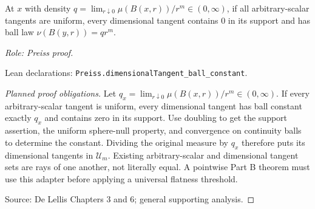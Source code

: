 \begin{lemma}
\label{lem:dimensional-tangent-ball-constant}






At $x$ with density $q=\lim_{r\downarrow0}\mu(B(x,r))/r^m\in(0,\infty)$, if all arbitrary-scalar tangents are uniform, every dimensional tangent contains $0$ in its support and has ball law $\nu(B(y,r))=qr^m$.
\par\emph{Role: Preiss proof.}
\par Lean declarations: \texttt{Preiss.dimensionalTangent\_ball\_constant}.
\end{lemma}
\begin{proof}[Planned proof obligations]

Let $q_x=\lim_{r\downarrow0}\mu(B(x,r))/r^m\in(0,\infty)$.
If every arbitrary-scalar tangent is uniform, every dimensional tangent
has ball constant exactly $q_x$ and contains zero in its support.
Use doubling to get the support assertion, the uniform sphere-null property,
and convergence on continuity balls to determine the constant. Dividing the
original measure by $q_x$ therefore puts its dimensional tangents in
$\mathcal U_m$. Existing arbitrary-scalar and dimensional tangent sets are rays
of one another, not literally equal. A pointwise Part B theorem must use this
adapter before applying a universal flatness threshold.
\par Source: De Lellis Chapters 3 and 6; general supporting analysis.
\end{proof}

